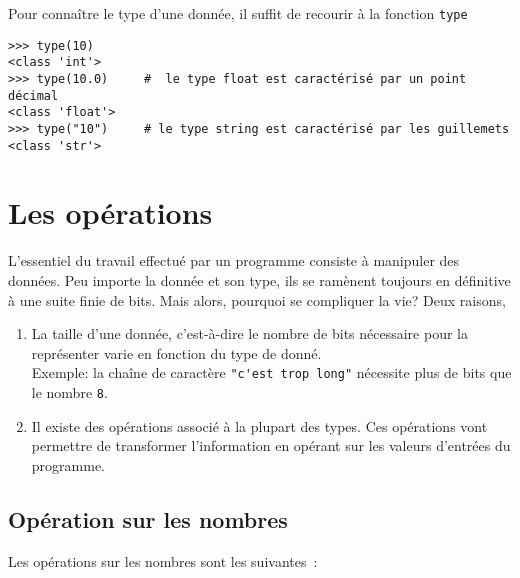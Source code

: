 \begin{apprendre}
	Pour connaître le type d’une donnée, il suffit de recourir à la fonction \lstinline{type}
	\begin{lstlisting}[numbers=none]
>>> type(10)
<class 'int'>
>>> type(10.0)     #  le type float est caractérisé par un point décimal
<class 'float'>
>>> type("10")     # le type string est caractérisé par les guillemets
<class 'str'>
	\end{lstlisting}
\end{apprendre}


\section{Les opérations}
L’essentiel du travail effectué par un programme consiste à manipuler des données. Peu importe la donnée et son type, ils se ramènent toujours en définitive à une suite finie de bits. Mais alors, pourquoi se compliquer la vie? Deux raisons,
\begin{enumerate}
	\item La taille d'une donnée, c'est-à-dire le nombre de bits nécessaire pour la représenter varie en fonction du type de donné.\\
	Exemple: la chaîne de caractère \lstinline{"c'est trop long"} nécessite plus de bits que le nombre  \lstinline{8}.
	\item Il existe des opérations associé à la plupart des types. Ces opérations vont permettre de transformer l'information en opérant sur les valeurs d'entrées du programme.
\end{enumerate}


\subsection{Opération sur les nombres}
Les opérations sur les nombres sont les suivantes :


